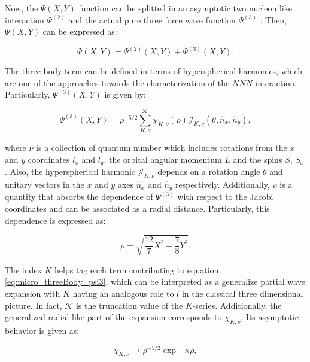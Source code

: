 \documentclass[openany]{book}
\begin{document}
Now, the $\Psi(X, Y)$ function can be splitted in an asymptotic two nucleon like interaction $\Psi^{(2)}$ and the actual pure three force wave function $\Psi^{(3)}$ . Then, $\Psi(X, Y)$ can be expressed as: 

\begin{equation}\label{eq:micro_threeBody_splitting}
	\Psi(X, Y) = \Psi^{(2)}(X, Y) +  \Psi^{(3)}(X, Y).
\end{equation}

The three body term can be defined in terms of hyperspherical harmonics, which are one of the approaches towards the characterization of the $NNN$ interaction. Particularly, $ \Psi^{(3)}(X, Y)$ is given by: 


\begin{equation}\label{eq:micro_threeBody_psi3}
	\Psi^{(3)}(X, Y) = \rho^{-5/2} \sum_{K, \nu}^{\mathcal{K}} {\chi_{K, \nu}(\rho) \mathcal{J}_{K, \nu} (\theta, {\hat n}_x, {\hat n}_y ) },
\end{equation}

where $\nu$ is a collection of quantum number which includes rotations from the $x$ and $y$ coordinates $l_x$ and $l_y$, the orbital angular momentum $L$ and the spins $S$, $S_x$. Also, the hyperspherical harmonic $\mathcal{J}_{K, \nu}$ depends on a rotation angle $\theta$ and unitary vectors in the $x$ and $y$ axes ${\hat n}_x$ and ${\hat n}_y$ respectively. Additionally, $\rho$ is a quantity that absorbs the dependence of $\Psi^{(3)}$  with respect to the Jacobi coordinates and can be associated as a radial distance.  Particularly, this dependence is expressed as: 

\begin{equation}\label{eq:micro_threeBody_rho}
	\rho = \sqrt{ \frac{12}{7} X^2 + \frac{7}{8} Y^2}.
\end{equation}

The index $K$ helps tag each term contributing to equation \ref{eq:micro_threeBody_psi3}, which can be interpreted as a generalize partial wave expansion with $K$ having an analogous role to $l$ in the classical three dimensional picture. In fact, $\mathcal{K}$ is the truncation value of the $K$-series. Additionally, the generalized radial-like part of the expansion corresponds to  $\chi_{K, \nu}$. Its asymptotic behavior is given as: 

\begin{equation}\label{eq:micro_threeBody_chiAsymptotics}
	\chi_{K, \nu} \rightarrow \rho^{-5/2} \exp{- \kappa \rho},
\end{equation}
\end{document}
